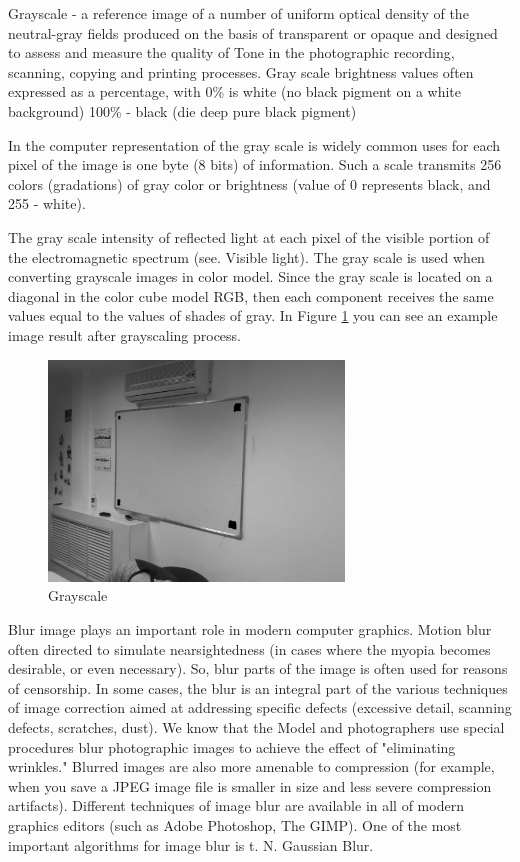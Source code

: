 Grayscale - a reference image of a number of uniform optical density of the neutral-gray fields produced on the basis of transparent or opaque and designed to assess and measure the quality of Tone in the photographic recording, scanning, copying and printing processes. Gray scale brightness values often expressed as a percentage, with 0\% is white (no black pigment on a white background) 100\% - black (die deep pure black pigment)

In the computer representation of the gray scale is widely common uses for each pixel of the image is one byte (8 bits) of information. Such a scale transmits 256 colors (gradations) of gray color or brightness (value of 0 represents black, and 255 - white).

The gray scale intensity of reflected light at each pixel of the visible portion of the electromagnetic spectrum (see. Visible light).
The gray scale is used when converting grayscale images in color model. Since the gray scale is located on a diagonal in the color cube model RGB, then each component receives the same values equal to the values of shades of gray. In Figure \ref{fig:grayscale} you can see an example image result after grayscaling process.

\begin{figure}[h]
    \centering
    \includegraphics[width=0.7\textwidth]{Figures/grayscale}
    \caption{Grayscale}
    \label{fig:grayscale}
\end{figure}


Blur image plays an important role in modern computer graphics. Motion blur often directed to simulate nearsightedness (in cases where the myopia becomes desirable, or even necessary). So, blur parts of the image is often used for reasons of censorship. In some cases, the blur is an integral part of the various techniques of image correction aimed at addressing specific defects (excessive detail, scanning defects, scratches, dust). We know that the Model and photographers use special procedures blur photographic images to achieve the effect of "eliminating wrinkles." Blurred images are also more amenable to compression (for example, when you save a JPEG image file is smaller in size and less severe compression artifacts). Different techniques of image blur are available in all of modern graphics editors (such as Adobe Photoshop, The GIMP). One of the most important algorithms for image blur is t. N. Gaussian Blur.

